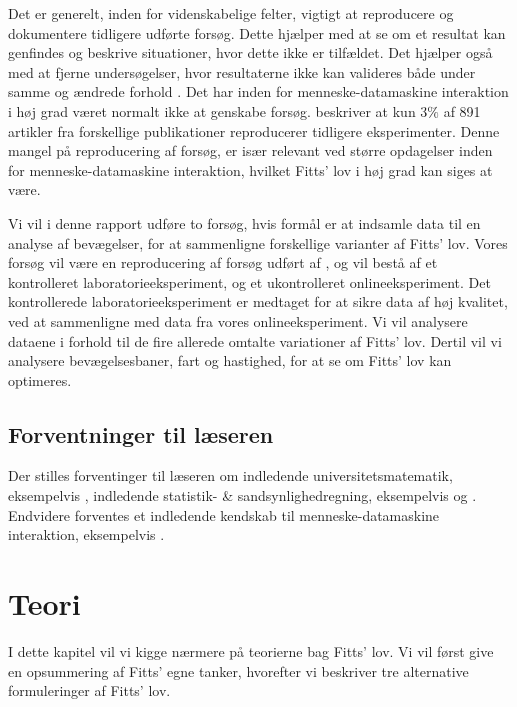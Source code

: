 Det er generelt, inden for videnskabelige felter, vigtigt at reproducere og dokumentere tidligere udførte forsøg. Dette hjælper med at se om et resultat kan genfindes og beskrive situationer, hvor dette ikke er tilfældet. Det hjælper også med at fjerne undersøgelser, hvor resultaterne ikke kan valideres både under samme og ændrede forhold \cite{hornbaek2014}. Det har inden for menneske-datamaskine interaktion i høj grad været normalt ikke at genskabe forsøg. \cite{hornbaek2014} beskriver at kun $3\%$ af 891 artikler fra forskellige publikationer reproducerer tidligere eksperimenter. Denne mangel på reproducering af forsøg, er især relevant ved større opdagelser inden for menneske-datamaskine interaktion, hvilket Fitts' lov i høj grad kan siges at være.

Vi vil i denne rapport udføre to forsøg, hvis formål er at indsamle data til en analyse af bevægelser, for at sammenligne forskellige varianter af Fitts' lov. Vores forsøg vil være en reproducering af forsøg udført af \cite{accot1997, goldberg2015}, og vil bestå af et kontrolleret laboratorieeksperiment, og et ukontrolleret onlineeksperiment. Det kontrollerede laboratorieeksperiment er medtaget for at sikre data af høj kvalitet, ved at sammenligne med data fra vores onlineeksperiment. Vi vil analysere dataene i forhold til de fire allerede omtalte variationer af Fitts' lov. Dertil vil vi analysere bevægelsesbaner, fart og hastighed, for at se om Fitts' lov kan optimeres.\\

\section*{Forventninger til læseren}
Der stilles forventinger til læseren om indledende universitetsmatematik, eksempelvis \cite{kolman2008}, indledende statistik- \& sandsynlighedregning, eksempelvis \cite{ditlevsen2011} og \cite{soerensen2003}. Endvidere forventes et indledende kendskab til menneske-datamaskine interaktion, eksempelvis \cite{hartson2012}.

\chapter*{Teori}
I dette kapitel vil vi kigge nærmere på teorierne bag Fitts' lov. Vi vil først give en opsummering af Fitts' egne tanker, hvorefter vi beskriver tre alternative formuleringer af Fitts' lov.

